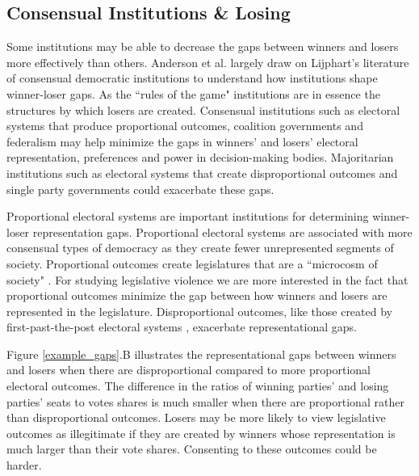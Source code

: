 \documentclass[a4paper]{article}\usepackage{graphicx, color}
\begin{document}
\subsection{Consensual Institutions \& Losing}

Some institutions may be able to decrease the gaps between winners and losers more effectively than others. Anderson et al. \citeyearpar[Chapter 7]{Anderson2005} largely draw on Lijphart's literature of consensual democratic institutions \citeyearpar{Lijphart1977, Lijphart1984, Lijphart1991, lijphart1999, Lijphart2004} to understand how institutions shape winner-loser gaps. As the ``rules of the game" \citep{North1990} institutions are in essence the structures by which losers are created. Consensual institutions such as electoral systems that produce proportional outcomes, coalition governments and federalism may help  minimize the gaps in winners' and losers' electoral representation, preferences and power in decision-making bodies. Majoritarian institutions such as electoral systems that create disproportional outcomes and single party governments could exacerbate these gaps.

Proportional electoral systems are important institutions for determining winner-loser representation gaps. Proportional electoral systems are associated with more consensual types of democracy \citep{Powell2000} as they create fewer unrepresented segments of society. Proportional outcomes create legislatures that are a ``microcosm of society" \citep{Carey2011}. For studying legislative violence we are more interested in the fact that proportional outcomes minimize the gap between how winners and losers are represented in the legislature. Disproportional outcomes, like those created by first-past-the-post electoral systems \citep[see][]{Duverger1954}, exacerbate representational gaps. 

Figure \ref{example_gaps}.B illustrates the representational gaps between winners and losers when there are disproportional compared to more proportional electoral outcomes.  The difference in the ratios of winning parties' and losing parties' seats to votes shares is much smaller when there are proportional rather than disproportional outcomes. Losers may be more likely to view legislative outcomes as illegitimate if they are created by winners whose representation is much larger than their vote shares. Consenting to these outcomes could be harder.
\end{document}
